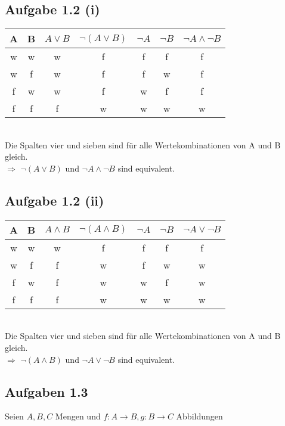 \documentclass{article}
\begin{document}
        \subsection*{Aufgabe 1.2 (i)}
            \begin{tabular}{c c c c c c c}
                A & B & \( A \lor B \) & \( \lnot ( A \lor B) \) & \( \lnot A \) & \( \lnot B \) & \( \lnot A \land \lnot B \) \\
                \midrule
                w & w & w & f & f & f & f\\
                w & f & w & f & f & w & f\\
                f & w & w & f & w & f & f\\
                f & f & f & w & w & w & w\\
            \end{tabular} \\
            Die Spalten vier und sieben sind für alle Wertekombinationen von A und B gleich. \\
            \( \Rightarrow \) \( \lnot ( A \lor B) \) und \( \lnot A \land \lnot B \) sind equivalent.

        \subsection*{Aufgabe 1.2 (ii)}

            \begin{tabular}{c c c c c c c}
                A & B & \( A \land B \) & \( \lnot ( A \land B ) \) & \( \lnot A \) & \( \lnot B \) & \( \lnot A \lor \lnot B \) \\
                \midrule
                w & w & w & f & f & f & f\\
                w & f & f & w & f & w & w\\
                f & w & f & w & w & f & w\\
                f & f & f & w & w & w & w\\
            \end{tabular} \\
            Die Spalten vier und sieben sind für alle Wertekombinationen von A und B gleich. \\
            \( \Rightarrow \) \( \lnot ( A \land B) \) und \( \lnot A \lor \lnot B \) sind equivalent.

        \subsection*{Aufgaben 1.3}
            Seien \(A, B, C\) Mengen und \(f: A \rightarrow B, g: B \rightarrow C\) Abbildungen
\end{document}
